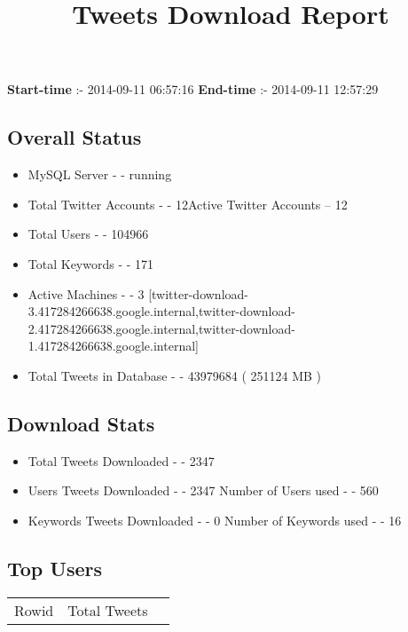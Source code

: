 \documentclass{article}\usepackage[T1]{fontenc}
\begin{document}
\title{\textbf{Tweets Download Report}}
               \date{}
                \maketitle
               \centerline{\textbf{Start-time} :- 2014-09-11 06:57:16 \hspace{40pt} \textbf{End-time} :- 2014-09-11 12:57:29}               \subsection*{Overall Status}                \begin{itemize}                \item MySQL Server - - running               \item Total Twitter Accounts - - 12\newline Active Twitter Accounts -- 12               \item Total Users - - 104966               \item Total Keywords - - 171               \item Active Machines - - 3 [twitter-download-3.417284266638.google.internal,twitter-download-2.417284266638.google.internal,twitter-download-1.417284266638.google.internal]               \item Total Tweets in Database - - 43979684 ( 251124 MB )               \end{itemize}               \subsection*{Download Stats}                \begin{itemize}                \item Total Tweets Downloaded - - 2347               \item Users Tweets Downloaded - - 2347 \newline Number of Users used - - 560               \item Keywords Tweets Downloaded - - 0 \newline Number of Keywords used - - 16              \end{itemize}              \subsection*{Top Users}\begin{tabular}{|c|c|c|}         \hline         Rowid & Total Tweets \\ 

\end{tabular}
\end{document}
